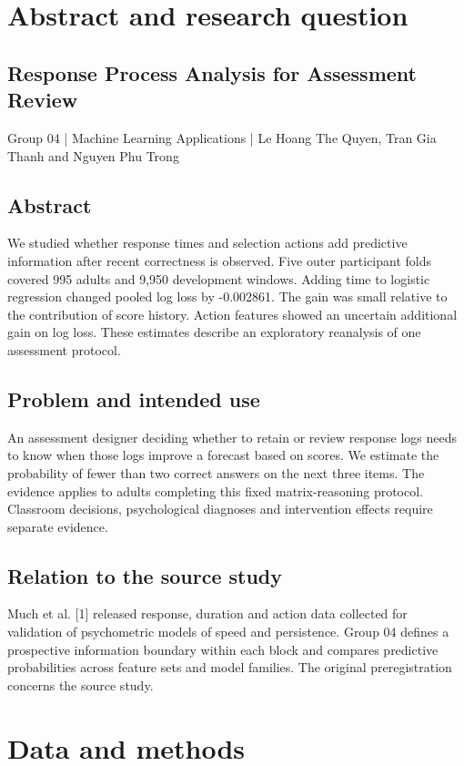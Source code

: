 \documentclass[10pt]{article}
\begin{document}
\section*{Abstract and research question}
\subsection*{Response Process Analysis for Assessment Review}
Group 04 | Machine Learning Applications | Le Hoang The Quyen, Tran Gia Thanh and Nguyen Phu Trong

\subsection*{Abstract}
We studied whether response times and selection actions add predictive information after recent correctness is observed. Five outer participant folds covered 995 adults and 9,950 development windows. Adding time to logistic regression changed pooled log loss by -0.002861. The gain was small relative to the contribution of score history. Action features showed an uncertain additional gain on log loss. These estimates describe an exploratory reanalysis of one assessment protocol.

\subsection*{Problem and intended use}
An assessment designer deciding whether to retain or review response logs needs to know when those logs improve a forecast based on scores. We estimate the probability of fewer than two correct answers on the next three items. The evidence applies to adults completing this fixed matrix-reasoning protocol. Classroom decisions, psychological diagnoses and intervention effects require separate evidence.

\subsection*{Relation to the source study}
Much et al. [1] released response, duration and action data collected for validation of psychometric models of speed and persistence. Group 04 defines a prospective information boundary within each block and compares predictive probabilities across feature sets and model families. The original preregistration concerns the source study.

\clearpage
\section*{Data and methods}
\end{document}
